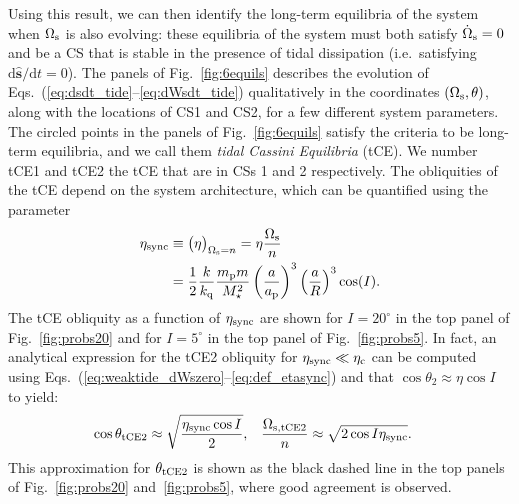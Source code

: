 \documentclass[
        fleqn,
        usenatbib,
    ]{mnras}
\newcommand*{\rdil}[2]{\mathrm{d}#1/\mathrm{d}#2}
\newcommand*{\p}[1]{\left(#1\right)}
\newcommand*{\uv}[1]{\hat{\mathbf{#1}}}
\begin{document}
Using this result, we can then identify the long-term equilibria of the system
when $\Omega_{\rm s}$ is also evolving: these equilibria of the system must both
satisfy $\dot{\Omega}_{\rm s} = 0$ and be a CS that is stable in the presence of
tidal dissipation (i.e.\ satisfying $\rdil{\uv{s}}{t} = 0$).
The panels of Fig.~\ref{fig:6equils} describes the evolution of
Eqs.~(\ref{eq:dsdt_tide}--\ref{eq:dWsdt_tide}) qualitatively in the coordinates
$(\Omega_{\rm s}, \theta)$, along with the locations of CS1 and CS2, for a few
different system parameters. The circled points in the panels of
Fig.~\ref{fig:6equils} satisfy the criteria to be long-term equilibria, and we
call them \emph{tidal Cassini Equilibria} (tCE). We number tCE1 and tCE2 the tCE
that are in CSs 1 and 2 respectively. The obliquities of the tCE depend on the
system architecture, which can be quantified using the parameter
\begin{align}
    \eta_{\rm sync} &\equiv \big(\eta\big)_{\Omega_{\rm s} = n}
        = \eta \frac{\Omega_{\rm s}}{n}\nonumber\\
        &= \frac{1}{2}\frac{k}{k_{\rm q}}
            \frac{m_{\rm p}m}{M_\star^2}
            \p{\frac{a}{a_{\rm p}}}^3 \p{\frac{a}{R}}^3\cos(I).
            \label{eq:def_etasync}
\end{align}
The tCE obliquity as a function of $\eta_{\rm sync}$ are shown for $I =
20^\circ$ in the top panel of Fig.~\ref{fig:probs20} and for $I = 5^\circ$ in
the top panel of Fig.~\ref{fig:probs5}. In fact, an analytical expression for
the tCE2 obliquity for $\eta_{\rm sync} \ll \eta_{\rm c}$ can be computed using
Eqs.~(\ref{eq:weaktide_dWszero}--\ref{eq:def_etasync}) and that $\cos \theta_2
\approx \eta \cos I$ to yield:
\begin{align}
    \cos \theta_{\rm tCE2} &\approx \sqrt{\frac{\eta_{\rm sync} \cos I}{2}},
        &
    \frac{\Omega_{\rm s, tCE2}}{n} &\approx
        \sqrt{2\cos I \eta_{\rm sync}}. \label{eq:def_tce2_approx}
\end{align}
This approximation for $\theta_{\rm tCE2}$ is shown as the black dashed line in
the top panels of Fig.~\ref{fig:probs20} and~\ref{fig:probs5}, where good
agreement is observed.
\end{document}
